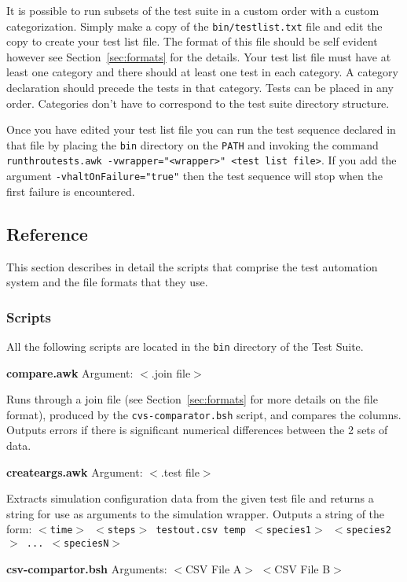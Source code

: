 \documentclass{cekarticle}
\begin{document}
It is possible to run subsets of the test suite in a custom order
with a custom categorization.  Simply make a copy of the
\texttt{bin/testlist.txt} file and edit the copy to create
your test list file. The format of this file should be self
evident however see Section~\ref{sec:formats} for the details.
Your test list file must have at least one category and there
should at least one test in each category.  A category declaration
should precede the tests in that category.  Tests can be placed in
any order. Categories don't have to correspond to the test suite
directory structure.

Once you have edited your test list file you can run the test
sequence declared in that file by placing the \texttt{bin}
directory on the \texttt{PATH} and invoking the command
\texttt{runthroutests.awk -vwrapper="<wrapper>" <test list file>}.
If you add the argument \texttt{-vhaltOnFailure="true"} then the
test sequence will stop when the first failure is encountered.

\subsection{Reference} \label{sec:auto-reference}

This section describes in detail the scripts that comprise the
test automation system and the file formats that they use.

\subsubsection{Scripts}

All the following scripts are located in the \texttt{bin} directory
of the Test Suite.

\textbf{compare.awk} Argument: $<$.join file$>$

Runs through a join file (see Section~\ref{sec:formats} for more
details on the file format), produced by the
\texttt{cvs-comparator.bsh} script, and compares the columns.
Outputs errors if there is significant numerical differences
between the 2 sets of data.

\textbf{createargs.awk} Argument: $<$.test file$>$

Extracts simulation configuration data from the given test file
and returns a string for use as arguments to the simulation
wrapper. Outputs a string of the form: \texttt{$<$time$>$
$<$steps$>$ testout.csv temp $<$species1$>$ $<$species2$>$ ...
$<$speciesN$>$}

\textbf{csv-compartor.bsh} Arguments: $<$CSV File A$>$ $<$CSV File
B$>$
\end{document}
